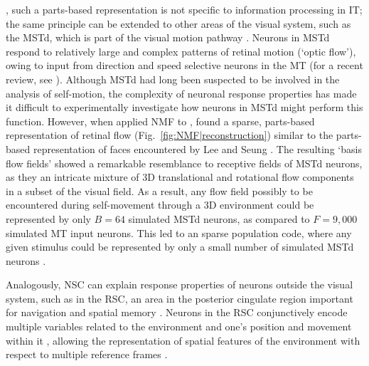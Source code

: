 , such a parts-based representation is not specific to
information processing in \ac{IT};
the same principle can be extended to other areas of the visual system,
such as the \ac{MSTd},
which is part of the visual motion pathway \cite{Beyeler2016}.
Neurons in \ac{MSTd} respond to relatively large and complex patterns
of retinal motion (`optic flow'),
owing to input from direction and speed selective neurons in the \ac{MT}
(for a recent review, see \cite{Orban2007}).
Although \ac{MSTd} had long been suspected to be involved in the
analysis of self-motion,
the complexity of neuronal response properties has made it difficult
to experimentally investigate how neurons in \ac{MSTd}
might perform this function.
However, when  
applied \ac{NMF} to 
\cite{Beyeler2016},
 found a sparse, parts-based representation of retinal flow
(Fig.~\ref{fig:NMF|reconstruction})
similar to the parts-based representation of faces
encountered by Lee and Seung \cite{LeeSeung1999}.
The resulting `basis flow fields' showed a remarkable resemblance to receptive fields
of \ac{MSTd} neurons, as they 
an intricate mixture of
3D translational and rotational flow components
in a subset of the visual field.
As a result, any flow field possibly to be encountered 
during self-movement through a 3D environment
could be represented by only $B = 64$ simulated \ac{MSTd} neurons,
as compared to $F = 9,000$ simulated \ac{MT} input neurons.
This led to an sparse  population code,
where any given stimulus could be represented
by only a small number of simulated \ac{MSTd} neurons
\cite{Beyeler2016}.

Analogously, \ac{NSC} can explain response properties
of neurons outside the visual system, 
such as in the \ac{RSC}, an area in the posterior cingulate region
important for navigation and spatial memory \cite{Miller2014,Nelson2015,VannAggleton2009}.
Neurons in the \ac{RSC} conjunctively encode multiple variables related to the environment and one's position and movement within it
,
allowing the representation of spatial features of the environment 
with respect to multiple reference frames \cite{AlexanderNitz2015}.

